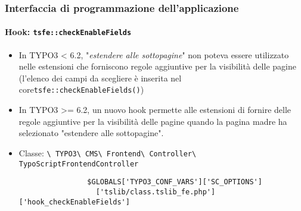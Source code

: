 \begin{frame}[fragile]
	\frametitle{Interfaccia di programmazione dell'applicazione}
	\framesubtitle{Hook: \texttt{tsfe::checkEnableFields}}

	\begin{itemize}
		\item In TYPO3 < 6.2, "\emph{estendere alle sottopagine}" non poteva essere utilizzato nelle estensioni che forniscono regole aggiuntive per la visibilità delle pagine\newline
			\small(l'elenco dei campi da scegliere è inserita nel core\texttt{tsfe::checkEnableFields()})\normalsize

		\item In TYPO3 >= 6.2, un nuovo hook permette alle estensioni di fornire delle regole aggiuntive per la visibilità delle pagine quando la pagina madre ha selezionato "estendere alle sottopagine".
		\item Classe:\newline
			\smaller
				\texttt{\textbackslash
					TYPO3\textbackslash
					CMS\textbackslash
					Frontend\textbackslash
					Controller\textbackslash
					TypoScriptFrontendController}\normalsize

			\lstset{
				basicstyle=\smaller\ttfamily
			}

			\begin{lstlisting}
				$GLOBALS['TYPO3_CONF_VARS']['SC_OPTIONS']
				  ['tslib/class.tslib_fe.php']['hook_checkEnableFields']
			\end{lstlisting}

	\end{itemize}

\end{frame}


